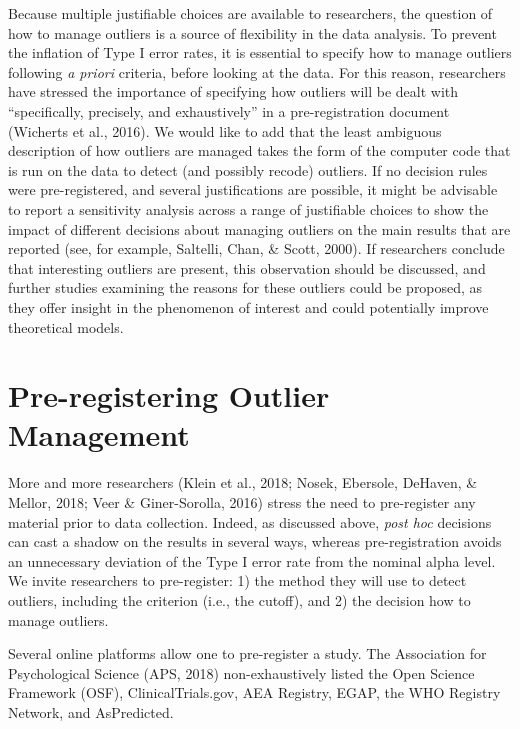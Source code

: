 \documentclass[man,floatsintext]{apa6}
\begin{document}
Because multiple justifiable choices are available to researchers, the question of how to manage outliers is a source of flexibility in the data analysis. To prevent the inflation of Type I error rates, it is essential to specify how to manage outliers following \emph{a priori} criteria, before looking at the data. For this reason, researchers have stressed the importance of specifying how outliers will be dealt with \enquote{specifically, precisely, and exhaustively} in a pre-registration document (Wicherts et al., 2016). We would like to add that the least ambiguous description of how outliers are managed takes the form of the computer code that is run on the data to detect (and possibly recode) outliers. If no decision rules were pre-registered, and several justifications are possible, it might be advisable to report a sensitivity analysis across a range of justifiable choices to show the impact of different decisions about managing outliers on the main results that are reported (see, for example, Saltelli, Chan, \& Scott, 2000). If researchers conclude that interesting outliers are present, this observation should be discussed, and further studies examining the reasons for these outliers could be proposed, as they offer insight in the phenomenon of interest and could potentially improve theoretical models.

\hypertarget{pre-registering-outlier-management}{%
\section{Pre-registering Outlier Management}\label{pre-registering-outlier-management}}

More and more researchers (Klein et al., 2018; Nosek, Ebersole, DeHaven, \& Mellor, 2018; Veer \& Giner-Sorolla, 2016) stress the need to pre-register any material prior to data collection. Indeed, as discussed above, \emph{post hoc} decisions can cast a shadow on the results in several ways, whereas pre-registration avoids an unnecessary deviation of the Type I error rate from the nominal alpha level. We invite researchers to pre-register:
1) the method they will use to detect outliers, including the criterion (i.e., the cutoff), and 2) the decision how to manage outliers.

Several online platforms allow one to pre-register a study. The Association for Psychological Science (APS, 2018) non-exhaustively listed the Open Science Framework (OSF), ClinicalTrials.gov, AEA Registry, EGAP, the WHO Registry Network, and AsPredicted.
\end{document}
